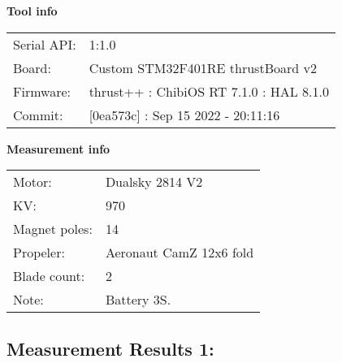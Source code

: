 \documentclass[10pt]{article}
\begin{document}
\noindent
{\large \bf Tool info}
\vspace{3mm}

\noindent
\begin{tabular}{ll}
Serial API:  & 1:1.0\\ 
Board:       & Custom STM32F401RE thrustBoard v2\\ 
Firmware:    & thrust++ : ChibiOS RT 7.1.0 : HAL 8.1.0\\ 
Commit:      & [0ea573c] : Sep 15 2022 - 20:11:16
\end{tabular}
\vspace{3mm}

\noindent
{\large \bf Measurement info}
\vspace{3mm}

\noindent
\begin{tabular}{ll}
Motor:        & Dualsky 2814 V2\\ 
KV:           & 970\\ 
Magnet poles: & 14\\ 
Propeler:     & Aeronaut CamZ 12x6 fold\\ 
Blade count:  & 2\\ 
Note:         & Battery 3S.
\end{tabular}

\vspace{3mm}


\subsection*{\large \bf Measurement Results 1:}
\end{document}
